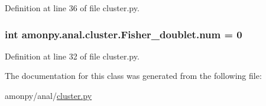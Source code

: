 Definition at line 36 of file cluster.\-py.

\hypertarget{classamonpy_1_1anal_1_1cluster_1_1_fisher__doublet_adcbadc44ade386a15365bcf018643e7b}{
\subsubsection[{num}]{\setlength{\rightskip}{0pt plus 5cm}int amonpy.\-anal.\-cluster.\-Fisher\-\_\-doublet.\-num = 0\hspace{0.3cm}{\ttfamily [static]}}}\label{classamonpy_1_1anal_1_1cluster_1_1_fisher__doublet_adcbadc44ade386a15365bcf018643e7b}


Definition at line 32 of file cluster.\-py.



The documentation for this class was generated from the following file\-:\begin{DoxyCompactItemize}
\item 
amonpy/anal/\hyperlink{cluster_8py}{cluster.\-py}\end{DoxyCompactItemize}

